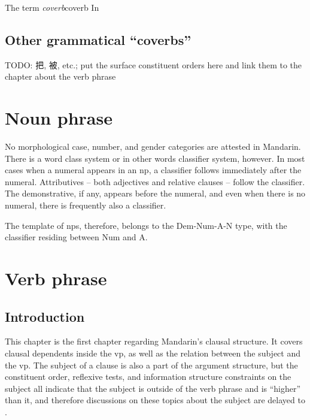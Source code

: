 \documentclass[UTF8, a4paper, oneside, scheme=plain, 12pt]{ctexrep}
\newcommand*{\term}[1]{\emph{#1}}
\begin{document}
\begin{infobox}{The term \term{coverb}}{coverb}
    In 
\end{infobox}

\section{Other grammatical ``coverbs''}

TODO: 把, 被, etc.; put the surface constituent orders here 
and link them to the chapter about the verb phrase

\chapter{Noun phrase}

No morphological case, number, and gender categories are attested in Mandarin.
There is a word class system or in other words classifier system, however.
In most cases when a numeral appears in an \ac{np},
a classifier follows immediately after the numeral.
Attributives -- both adjectives and relative clauses -- 
follow the classifier. %
The demonstrative, if any, appears before the numeral,
and even when there is no numeral,
there is frequently also a classifier.

The template of \ac{np}s, therefore, belongs to the 
Dem-Num-A-N type,
with the classifier residing between Num and A. 


\chapter{Verb phrase}\label{chap:verbal-complex}

\section{Introduction}

This chapter is the first chapter regarding Mandarin's clausal structure.
It covers clausal dependents inside the \acs{vp},
as well as the relation between the subject and the \acs{vp}.
The subject of a clause is also a part of the argument structure,
but the constituent order,
reflexive tests,
and information structure constraints on the subject
all indicate that the subject is outside of the verb phrase 
and is ``higher'' than it,
and therefore discussions on these topics about the subject 
are delayed to .
\end{document}

